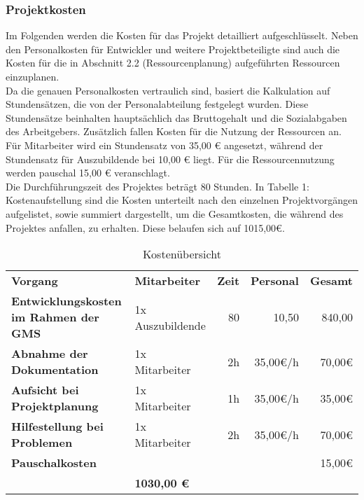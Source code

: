 \begin{flushleft}
\subsubsection{Projektkosten}
Im Folgenden werden die Kosten für das Projekt detailliert aufgeschlüsselt. Neben den Personalkosten für Entwickler und weitere Projektbeteiligte sind auch die Kosten für die in Abschnitt 2.2 (Ressourcenplanung) aufgeführten Ressourcen einzuplanen.
\\
Da die genauen Personalkosten vertraulich sind, basiert die Kalkulation auf Stundensätzen, die von der Personalabteilung festgelegt wurden. Diese Stundensätze beinhalten hauptsächlich das Bruttogehalt und die Sozialabgaben des Arbeitgebers. Zusätzlich fallen Kosten für die Nutzung der Ressourcen an.
\\
Für Mitarbeiter wird ein Stundensatz von 35,00 € angesetzt, während der Stundensatz für Auszubildende bei 10,00 € liegt. Für die Ressourcennutzung werden pauschal 15,00 € veranschlagt.
\\
Die Durchführungszeit des Projektes beträgt 80 Stunden. In Tabelle 1: Kostenaufstellung sind die
Kosten unterteilt nach den einzelnen Projektvorgängen aufgelistet, sowie summiert dargestellt, um die
Gesamtkosten, die während des Projektes anfallen, zu erhalten. Diese belaufen sich auf 1015,00€.

\begin{table}[h]
	\centering
	\begin{tabular}{ >{\bfseries}l l r r r }
		\rowcolor[HTML]{127017}
	\textbf{\color{white}Vorgang} & \textbf{\color{white}Mitarbeiter} & \textbf{\color{white}Zeit} & \textbf{\color{white}Personal} & \textbf{\color{white}Gesamt} \\
	Entwicklungskosten im Rahmen der GMS & 1x Auszubildende & 80 & 10,50 & 840,00 \\
	\rowcolor[HTML]{e1efd9}
	Abnahme der Dokumentation & 1x Mitarbeiter & 2h & 35,00€/h & 70,00€ \\
	Aufsicht bei Projektplanung & 1x Mitarbeiter & 1h & 35,00€/h & 35,00€ \\
	\rowcolor[HTML]{e1efd9}
	Hilfestellung bei Problemen & 1x Mitarbeiter & 2h & 35,00€/h & 70,00€ \\
	Pauschalkosten &  &  &  & 15,00€ \\
	\hline
	\rowcolor[HTML]{127017}
	\multicolumn{4}{r}{\textbf{\color{white}Gesamt}} & \textbf{\color{white}1030,00 €} \\
	\end{tabular}
	\caption{Kostenübersicht}
	\label{tab:kostenuebersicht}
	\end{table}


\end{flushleft}
